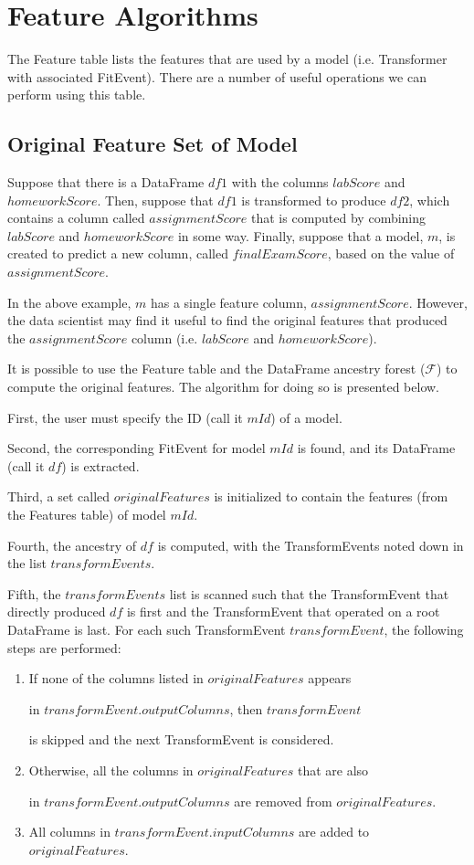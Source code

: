 \section{Feature Algorithms}
The Feature table lists the features that are used by a model (i.e. Transformer with associated FitEvent).
There are a number of useful operations we can perform using this table.

\subsection{Original Feature Set of Model}
Suppose that there is a DataFrame $df1$ with the columns $labScore$ and $homeworkScore$. Then,
suppose that $df1$ is transformed to produce $df2$, which contains a column called $assignmentScore$ that is
computed by combining $labScore$ and $homeworkScore$ in some way. Finally, suppose that a model, $m$, is created to
predict a new column, called $finalExamScore$, based on the value of $assignmentScore$.

In the above example, $m$ has a single feature column, $assignmentScore$. However, the data scientist may find
it useful to find the original features that produced the $assignmentScore$ column (i.e. $labScore$ and $homeworkScore$).

It is possible to use the Feature table and the DataFrame ancestry forest ($\mathcal{F}$) to compute the original
features. The algorithm for doing so is presented below.

First, the user must specify the ID (call it $mId$) of a model.

Second, the corresponding FitEvent for model $mId$ is found, and its DataFrame (call it $df$) is extracted.

Third, a set called $originalFeatures$ is initialized to contain the features (from the Features table) of model $mId$.

Fourth, the ancestry of $df$ is computed, with the TransformEvents noted down in the list $transformEvents$.

Fifth, the $transformEvents$ list is scanned such that the TransformEvent that directly produced $df$ is first and the
TransformEvent that operated on a root DataFrame is last. For each such TransformEvent $transformEvent$, the following steps are
performed:
\begin{enumerate}
  \item If none of the columns listed in $originalFeatures$ appears 

    in $transformEvent.outputColumns$, then $transformEvent$ 

    is skipped and the next TransformEvent is considered.
  \item Otherwise, all the columns in $originalFeatures$ that are also 

    in $transformEvent.outputColumns$ are removed from $originalFeatures$.
  \item All columns in $transformEvent.inputColumns$ are added to $originalFeatures$.
\end{enumerate}

